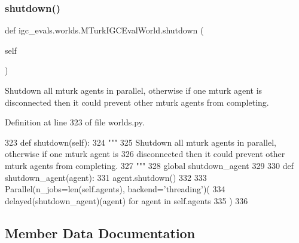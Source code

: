 \mbox{\label{classigc__evals_1_1worlds_1_1MTurkIGCEvalWorld_a8598b24c39425e921c38ef45fb1f7e95}} 
\subsubsection{\texorpdfstring{shutdown()}{shutdown()}}
{\footnotesize\ttfamily def igc\+\_\+evals.\+worlds.\+M\+Turk\+I\+G\+C\+Eval\+World.\+shutdown (\begin{DoxyParamCaption}\item[{}]{self }\end{DoxyParamCaption})}

\begin{DoxyVerb}Shutdown all mturk agents in parallel, otherwise if one mturk agent is
disconnected then it could prevent other mturk agents from completing.
\end{DoxyVerb}
 

Definition at line 323 of file worlds.\+py.


\begin{DoxyCode}
323     \textcolor{keyword}{def }shutdown(self):
324         \textcolor{stringliteral}{"""}
325 \textcolor{stringliteral}{        Shutdown all mturk agents in parallel, otherwise if one mturk agent is}
326 \textcolor{stringliteral}{        disconnected then it could prevent other mturk agents from completing.}
327 \textcolor{stringliteral}{        """}
328         \textcolor{keyword}{global} shutdown\_agent
329 
330         \textcolor{keyword}{def }shutdown\_agent(agent):
331             agent.shutdown()
332 
333         Parallel(n\_jobs=len(self.agents), backend=\textcolor{stringliteral}{'threading'})(
334             delayed(shutdown\_agent)(agent) \textcolor{keywordflow}{for} agent \textcolor{keywordflow}{in} self.agents
335         )
336 \end{DoxyCode}


\subsection{Member Data Documentation}
\mbox{\label{classigc__evals_1_1worlds_1_1MTurkIGCEvalWorld_a2d85992a36e835c15f629b2ad0cd098d}} 
